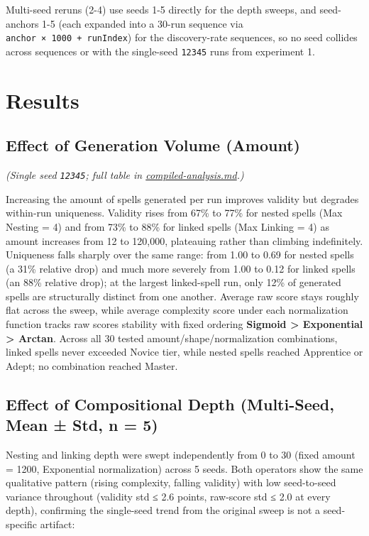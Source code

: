 \documentclass[
  10pt,
  twocolumn]{article}
\begin{document}
Multi-seed reruns (2-4) use seeds 1-5 directly for the depth sweeps, and
seed-anchors 1-5 (each expanded into a 30-run sequence via
\texttt{anchor\ ×\ 1000\ +\ runIndex}) for the discovery-rate sequences,
so no seed collides across sequences or with the single-seed
\texttt{12345} runs from experiment 1.

\section{Results}\label{results}

\subsection{Effect of Generation Volume
(Amount)}\label{effect-of-generation-volume-amount}

\emph{(Single seed \texttt{12345}; full table in
\url{compiled-analysis.md}.)}

Increasing the amount of spells generated per run improves validity but
degrades within-run uniqueness. Validity rises from 67\% to 77\% for
nested spells (Max Nesting = 4) and from 73\% to 88\% for linked spells
(Max Linking = 4) as amount increases from 12 to 120,000, plateauing
rather than climbing indefinitely. Uniqueness falls sharply over the
same range: from 1.00 to 0.69 for nested spells (a 31\% relative drop)
and much more severely from 1.00 to 0.12 for linked spells (an 88\%
relative drop); at the largest linked-spell run, only 12\% of generated
spells are structurally distinct from one another. Average raw score
stays roughly flat across the sweep, while average complexity score
under each normalization function tracks raw score\textquotesingle s
stability with fixed ordering \textbf{Sigmoid \textgreater{} Exponential
\textgreater{} Arctan}. Across all 30 tested amount/shape/normalization
combinations, linked spells never exceeded Novice tier, while nested
spells reached Apprentice or Adept; no combination reached Master.

\subsection{Effect of Compositional Depth (Multi-Seed, Mean ± Std, n =
5)}\label{effect-of-compositional-depth-multi-seed-mean--std-n--5}

Nesting and linking depth were swept independently from 0 to 30 (fixed
amount = 1200, Exponential normalization) across 5 seeds. Both operators
show the same qualitative pattern (rising complexity, falling validity)
with low seed-to-seed variance throughout (validity std ≤ 2.6 points,
raw-score std ≤ 2.0 at every depth), confirming the single-seed trend
from the original sweep is not a seed-specific artifact:
\end{document}
